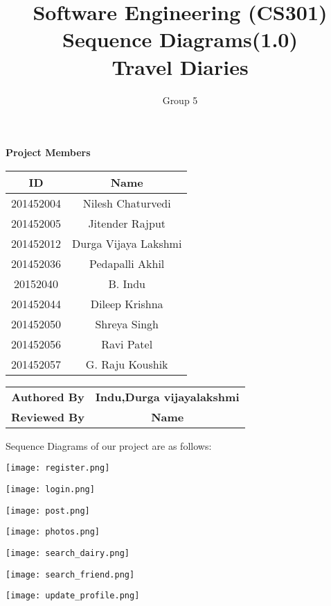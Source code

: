 \documentclass{article}
\title{Software Engineering (CS301)\\ Sequence Diagrams(1.0)\\Travel Diaries}
\author{Group 5}
\begin{document}
\maketitle
\begin{center}
\textbf{Project Members}\\
\vspace*{.6cm}
\begin{tabular}{|c|c|}
\hline
\textbf{ID} & \textbf{Name}\\
\hline
\hline
201452004 & Nilesh Chaturvedi\\
\hline
201452005 & Jitender Rajput\\
\hline
201452012 & Durga Vijaya Lakshmi\\
\hline
201452036 & Pedapalli Akhil\\
\hline
20152040 & B. Indu\\
\hline
201452044 & Dileep Krishna\\
\hline
201452050 & Shreya Singh\\
\hline
201452056 & Ravi Patel\\
\hline
201452057 & G. Raju Koushik\\
\hline
\end{tabular}

\vspace*{1cm}

\begin{tabular}{|c|c|}
\hline
\textbf{Authored By} & \textbf{Indu,Durga vijayalakshmi}\\
\textbf{Reviewed By} & \textbf{Name}\\
\hline
\end{tabular}
\end{center}

\newpage 
Sequence Diagrams of our project are as follows:
\graphicspath{ {/home/smily/Desktop/register.png/} }

\texttt{[image: register.png]}
\newpage
\graphicspath{ {/home/smily/Desktop/login.png/} }

\texttt{[image: login.png]}
\newpage
\graphicspath{ {/home/smily/Desktop/post.png/} }

\texttt{[image: post.png]}
\newpage
\graphicspath{ {/home/smily/Desktop/photos.png/} }

\texttt{[image: photos.png]}
\newpage
\graphicspath{ {/home/smily/Desktop/search_dairy.png} }

\texttt{[image: search\_dairy.png]}
\newpage
\graphicspath{ {/home/smily/Desktop/search_friend.png} }
\centering
\texttt{[image: search\_friend.png]}
\newpage
\graphicspath{ {/home/smily/Desktop/update_profile.png} }
\centering
\texttt{[image: update\_profile.png]}
\end{document}
